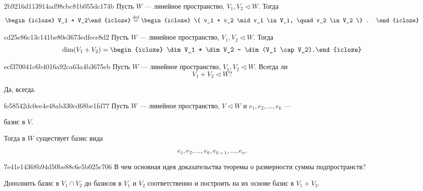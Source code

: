 \begin{note}{2b9216d113914ad98cbc81b055dc174b}
    Пусть \( W \) --- линейное пространство, \( V_1, V_2 \triangleleft W \).
    Тогда
    \[
        \begin{icloze}{2}V_1 + V_2\end{icloze} \overset{\text{def}}= \begin{icloze}{1}
            \{ v_1 + v_2 \mid v_1 \in V_1, \quad v_2 \in V_2 \} .
        \end{icloze}
    \]
\end{note}

\begin{note}{cd25e86c13c141be80e3673edfece8d2}
    Пусть \( W \) --- линейное пространство, \( V_1, V_2 \triangleleft W \).
    Тогда
    \[
        \dim (V_1 + V_2) = \begin{icloze}{1}\dim V_1 + \dim V_2 - \dim (V_1 \cap V_2).\end{icloze}
    \]
\end{note}

\begin{note}{ecf370041c6b4016a92ca63a4b3675eb}
    Пусть \( W \) --- линейное пространство, \( V_1, V_2 \triangleleft W \).
    Всегда ли
    \[
        V_1 + V_2 \triangleleft W?
    \]

    \begin{cloze}{1}
        Да, всегда.
    \end{cloze}
\end{note}

\begin{note}{fe58542dc0ee4e48ab330cd68be1fd77}
    Пусть \( W \) --- линейное пространство, \( V \triangleleft W \) и \( e_1, e_2, \ldots, e_k  \)  --- \begin{icloze}{2}базис в \( V. \)\end{icloze}
    Тогда в \( W \) существует базис вида \begin{icloze}{1}
        \[
            e_1, e_2, \ldots, e_k, e_{k + 1}, \ldots, e_n.
        \]
    \end{icloze}
\end{note}

\begin{note}{7e41e14368b94d50be88c6e5b025c706}
    В чем основная идея доказательства теоремы о размерности суммы подпространств?

    \begin{cloze}{1}
        Дополнить базис в \( V_1 \cap V_2 \) до базисов в \( V_1 \) и \( V_2 \) соответственно и построить на их основе базис в \( V_1 + V_2 \).
    \end{cloze}
\end{note}

